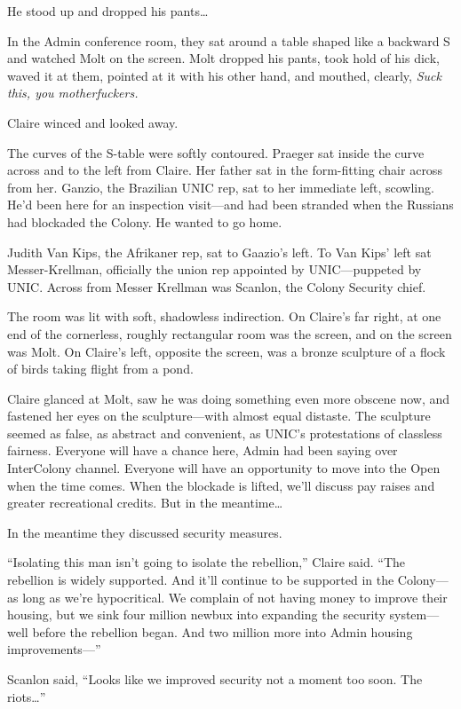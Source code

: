 He stood up and dropped his pants\ldots

In the Admin conference room, they sat around a table shaped like a backward S and watched Molt on the screen. Molt dropped his pants, took hold of his dick, waved it at them, pointed at it with his other hand, and mouthed, clearly, \textit{Suck this, you motherfuckers.}

Claire winced and looked away.

The curves of the S-table were softly contoured. Praeger sat inside the curve across and to the left from Claire. Her father sat in the form-fitting chair across from her. Ganzio, the Brazilian UNIC rep, sat to her immediate left, scowling. He'd been here for an inspection visit---and had been stranded when the Russians had blockaded the Colony. He wanted to go home.

Judith Van Kips, the Afrikaner rep, sat to Gaazio's left. To Van Kips' left sat Messer-Krellman, officially the union rep appointed by UNIC---puppeted by UNIC. Across from Messer Krellman was Scanlon, the Colony Security chief.

The room was lit with soft, shadowless indirection. On Claire's far right, at one end of the cornerless, roughly rectangular room was the screen, and on the screen was Molt. On Claire's left, opposite the screen, was a bronze sculpture of a flock of birds taking flight from a pond.

Claire glanced at Molt, saw he was doing something even more obscene now, and fastened her eyes on the sculpture---with almost equal distaste. The sculpture seemed as false, as abstract and convenient, as UNIC's protestations of classless fairness. Everyone will have a chance here, Admin had been saying over InterColony channel. Everyone will have an opportunity to move into the Open when the time comes. When the blockade is lifted, we'll discuss pay raises and greater recreational credits. But in the meantime\ldots

In the meantime they discussed security measures.

``Isolating this man isn't going to isolate the rebellion,'' Claire said. ``The rebellion is widely supported. And it'll continue to be supported in the Colony---as long as we're hypocritical. We complain of not having money to improve their housing, but we sink four million newbux into expanding the security system---well before the rebellion began. And two million more into Admin housing improvements---''

Scanlon said, ``Looks like we improved security not a moment too soon. The riots\ldots ''

